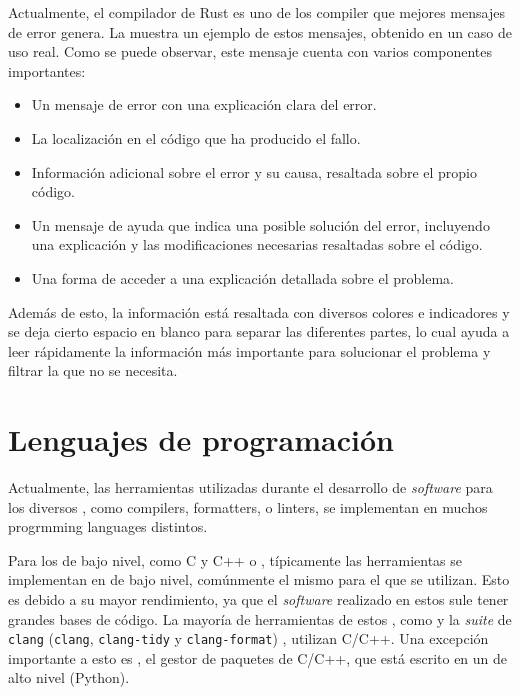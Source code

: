
Actualmente, el compilador de Rust \parencite{Rust} es uno de los
compiler que mejores mensajes de error genera. La 
muestra un ejemplo de estos mensajes, obtenido en un caso de uso real. Como se
puede observar, este mensaje cuenta con varios componentes importantes:

\begin{itemize}
    \item Un mensaje de error con una explicación clara del error.
    \item La localización en el código que ha producido el fallo.
    \item Información adicional sobre el error y su causa, resaltada sobre el
    propio código.
    \item Un mensaje de ayuda que indica una posible solución del error,
    incluyendo una explicación y las modificaciones necesarias resaltadas sobre
    el código.
    \item Una forma de acceder a una explicación detallada sobre el problema.
\end{itemize}

Además de esto, la información está resaltada con diversos colores e indicadores
y se deja cierto espacio en blanco para separar las diferentes partes, lo cual
ayuda a leer rápidamente la información más importante para solucionar el
problema y filtrar la que no se necesita.


\FloatBarrier

\section{Lenguajes de programación}\label{sec:programming-languages}

Actualmente, las herramientas utilizadas durante el desarrollo de
\textit{software} para los diversos ,
como \glspl{compiler}, \glspl{formatter}, o \glspl{linter}, se implementan en
muchos \glspl{progrmming language} distintos.

Para los  de bajo nivel, como C
\parencite{C} y C++ \parencite{cpp} o ,
típicamente las herramientas se implementan en  de bajo nivel, comúnmente el mismo para el que se utilizan.
Esto es debido a su mayor rendimiento, ya que el \textit{software} realizado en
estos  sule tener grandes bases de
código. La mayoría de herramientas de estos , como  y la \textit{suite} de \verb!clang!
(\verb!clang!, \verb!clang-tidy! y \verb!clang-format!) \parencite{clang},
utilizan C/C++. Una excepción importante a esto es , el gestor de
paquetes de C/C++, que está escrito en un 
de alto nivel (Python).

